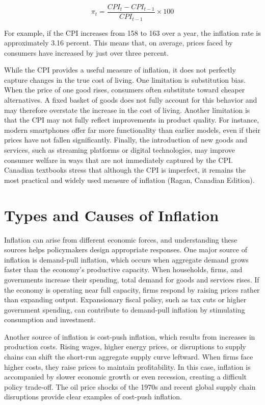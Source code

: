 \documentclass[12pt]{article}
\begin{document}
\[
\pi_t = \frac{CPI_t - CPI_{t-1}}{CPI_{t-1}} \times 100
\]

For example, if the CPI increases from 158 to 163 over a year, the inflation rate is approximately 3.16 percent. This means that, on average, prices faced by consumers have increased by just over three percent.

While the CPI provides a useful measure of inflation, it does not perfectly capture changes in the true cost of living. One limitation is substitution bias. When the price of one good rises, consumers often substitute toward cheaper alternatives. A fixed basket of goods does not fully account for this behavior and may therefore overstate the increase in the cost of living. Another limitation is that the CPI may not fully reflect improvements in product quality. For instance, modern smartphones offer far more functionality than earlier models, even if their prices have not fallen significantly. Finally, the introduction of new goods and services, such as streaming platforms or digital technologies, may improve consumer welfare in ways that are not immediately captured by the CPI. Canadian textbooks stress that although the CPI is imperfect, it remains the most practical and widely used measure of inflation (Ragan, Canadian Edition).

\section{Types and Causes of Inflation}

Inflation can arise from different economic forces, and understanding these sources helps policymakers design appropriate responses. One major source of inflation is demand-pull inflation, which occurs when aggregate demand grows faster than the economy’s productive capacity. When households, firms, and governments increase their spending, total demand for goods and services rises. If the economy is operating near full capacity, firms respond by raising prices rather than expanding output. Expansionary fiscal policy, such as tax cuts or higher government spending, can contribute to demand-pull inflation by stimulating consumption and investment.

Another source of inflation is cost-push inflation, which results from increases in production costs. Rising wages, higher energy prices, or disruptions to supply chains can shift the short-run aggregate supply curve leftward. When firms face higher costs, they raise prices to maintain profitability. In this case, inflation is accompanied by slower economic growth or even recession, creating a difficult policy trade-off. The oil price shocks of the 1970s and recent global supply chain disruptions provide clear examples of cost-push inflation.
\end{document}
